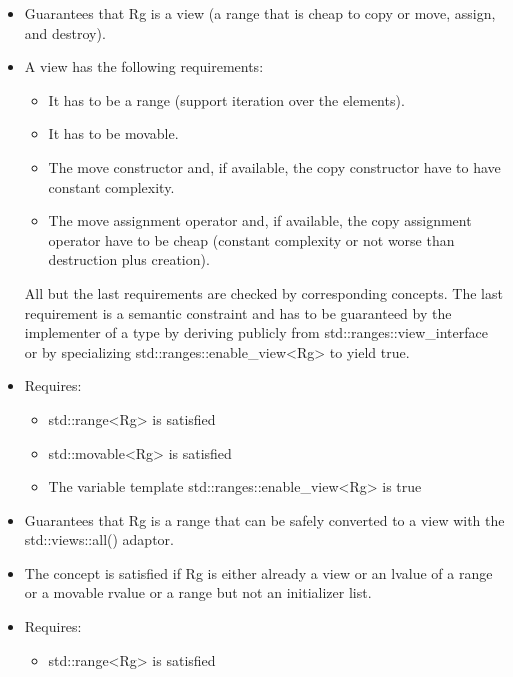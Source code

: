 \begin{itemize}
\item
Guarantees that Rg is a view (a range that is cheap to copy or move, assign, and destroy).

\item
A view has the following requirements:

\begin{itemize}
\item
It has to be a range (support iteration over the elements).

\item
It has to be movable.

\item
The move constructor and, if available, the copy constructor have to have constant complexity.

\item
The move assignment operator and, if available, the copy assignment operator have to be cheap (constant complexity or not worse than destruction plus creation).
\end{itemize}

All but the last requirements are checked by corresponding concepts. The last requirement is a semantic constraint and has to be guaranteed by the implementer of a type by deriving publicly from std::ranges::view\_interface or by specializing std::ranges::enable\_view<Rg> to yield true.

\item
Requires:

\begin{itemize}
\item
std::range<Rg> is satisfied

\item
std::movable<Rg> is satisfied

\item
The variable template std::ranges::enable\_view<Rg> is true
\end{itemize}
\end{itemize}


\begin{itemize}
\item
Guarantees that Rg is a range that can be safely converted to a view with the std::views::all() adaptor.

\item
The concept is satisfied if Rg is either already a view or an lvalue of a range or a movable rvalue or a range but not an initializer list.

\item
Requires:

\begin{itemize}
\item
std::range<Rg> is satisfied

\end{itemize}
\end{itemize}

